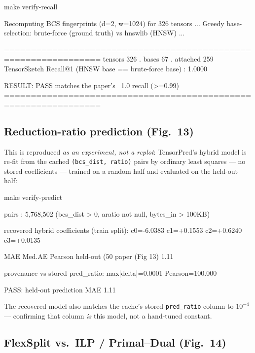 \documentclass[11pt]{article}
\newcommand{\code}[1]{\texttt{#1}}
\begin{document}
\begin{shell}
make verify-recall
\end{shell}
\begin{term}
Recomputing BCS fingerprints (d=2, w=1024) for 326 tensors ...
Greedy base-selection: brute-force (ground truth) vs hnswlib (HNSW) ...

================================================================
tensors 326  .  bases 67  .  attached 259
TensorSketch Recall@1 (HNSW base == brute-force base) : 1.0000

RESULT: PASS  matches the paper's ~1.0 recall (>=0.99)
================================================================
\end{term}

\subsection{Reduction-ratio prediction (Fig.~13)}

This is reproduced \emph{as an experiment, not a replot}: TensorPred's hybrid
model is re-fit from the cached \code{(bcs\_dist, ratio)} pairs by ordinary
least squares --- no stored coefficients --- trained on a random half and
evaluated on the held-out half:

\begin{shell}
make verify-predict
\end{shell}
\begin{term}
  pairs   : 5,768,502  (bcs_dist > 0, aratio not null, bytes_in > 100KB)

  recovered hybrid coefficients (train split):
    c0=-6.0383  c1=+0.1553  c2=+0.6240  c3=+0.0135

                               MAE    Med.AE     Pearson
  held-out (50%
  paper (Fig 13)             1.11%

  provenance vs stored pred_ratio: max|delta|=0.0001  Pearson=100.000%

  PASS: held-out prediction MAE 1.11%
\end{term}

The recovered model also matches the cache's stored \code{pred\_ratio}
column to $10^{-4}$ --- confirming that column \emph{is} this model, not a
hand-tuned constant.

\subsection{FlexSplit vs.\ ILP / Primal--Dual (Fig.~14)}
\end{document}
